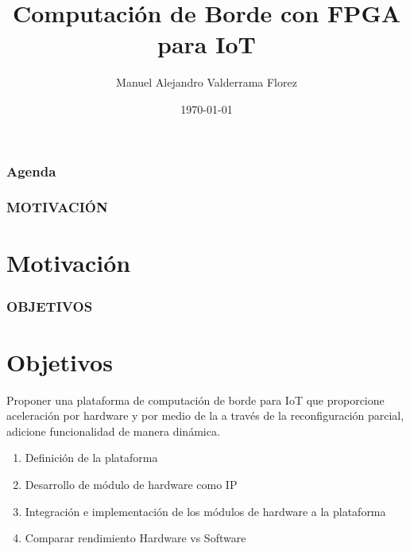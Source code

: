 \documentclass{beamer}
\title[]{Computación de Borde con FPGA para IoT } %
\author{Manuel Alejandro Valderrama Florez} %
\institute[PUJ] %
{
Pontificia Universidad Javeriana Cali \\ %
\medskip
\textit{mavalderrama@javerianacali.edu.co} %
}
\date{\today} %
\begin{document}
\begin{frame}
\titlepage %
\end{frame}

\begin{frame}
\frametitle{Agenda} %
\tableofcontents %
\end{frame}



\begin{frame}
\frametitle{MOTIVACIÓN}
\section{Motivación}

\end{frame}

\begin{frame}
\frametitle{OBJETIVOS}
\section{Objetivos}
Proponer una plataforma de computación de borde para IoT que proporcione aceleración por hardware y por medio de la  a través de la reconfiguración parcial, adicione funcionalidad de manera dinámica. 
\begin{enumerate}
    \item Definición de la plataforma
    \item Desarrollo de módulo de hardware como IP
    \item Integración e implementación de los módulos de hardware a la plataforma
    \item Comparar rendimiento Hardware vs Software
\end{enumerate}
    
\end{frame}
\end{document}
